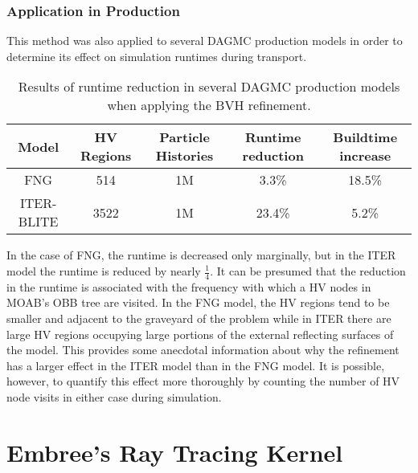 \subsubsection{Application in Production}

This method was also applied to several DAGMC production models in order to determine
its effect on simulation runtimes during transport.

\begin{table}[H]
  \centering
  \begin{tabular}{c c c c c}
    \toprule
    \textbf{Model} & \textbf{HV Regions} & \textbf{Particle Histories} & \textbf{Runtime reduction} & \textbf{Buildtime increase} \\
    \hline
    FNG            & 514                 & 1M                          & 3.3\%                      & 18.5\%                      \\
    ITER-BLITE     & 3522                & 1M                          & 23.4\%                     & 5.2\%                       \\
    \bottomrule
  \end{tabular}
  \caption{Results of runtime reduction in several DAGMC production models when applying the BVH refinement.}
  \label{tab:bvhrefine_production_results}
\end{table}    

In the case of FNG, the runtime is decreased only marginally, but in the ITER
model the runtime is reduced by nearly $\frac{1}{4}$. It can be presumed that
the reduction in the runtime is associated with the frequency with which a HV
nodes in MOAB's OBB tree are visited. In the FNG model, the HV regions tend to
be smaller and adjacent to the graveyard of the problem while in ITER there are
large HV regions occupying large portions of the external reflecting surfaces of
the model. This provides some anecdotal information about why the refinement has
a larger effect in the ITER model than in the FNG model. It is possible,
however, to quantify this effect more thoroughly by counting the number of HV
node visits in either case during simulation.

\section{Embree's Ray Tracing Kernel}\label{sec:emdag_hv_study}

